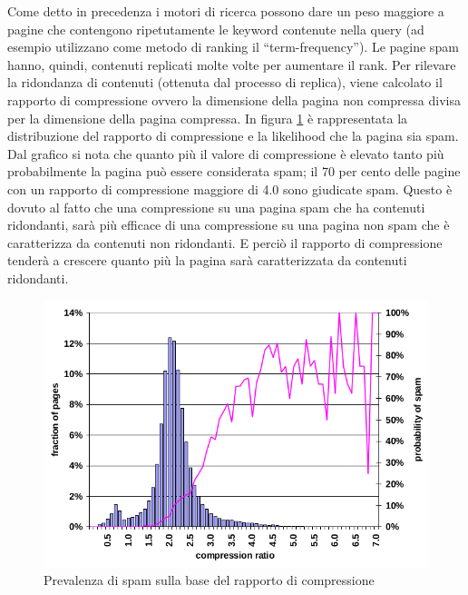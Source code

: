 Come detto in precedenza i  motori di ricerca possono dare un peso maggiore a pagine che contengono ripetutamente le keyword contenute nella query (ad esempio utilizzano come metodo di ranking il ``term-frequency''). Le pagine spam hanno, quindi,  contenuti replicati molte volte per aumentare il rank. Per rilevare la ridondanza di contenuti (ottenuta dal processo di replica), viene calcolato il rapporto di compressione ovvero la dimensione della pagina non compressa divisa per la dimensione della pagina compressa. In figura \ref{fig:fetterly8} è rappresentata la distribuzione del rapporto di compressione e la likelihood che la pagina sia spam. Dal grafico si nota che quanto più il valore di compressione è elevato tanto più probabilmente la pagina può essere considerata spam; il 70 per cento delle pagine con un rapporto di compressione maggiore di 4.0 sono giudicate spam. Questo è dovuto al fatto che una compressione su una pagina spam che ha contenuti ridondanti, sarà più efficace di una compressione su una pagina non spam che è caratterizza da contenuti non ridondanti. E perciò il rapporto di compressione tenderà a crescere quanto più la pagina sarà caratterizzata da contenuti ridondanti.
\begin{figure}[htbp]
\centering
\includegraphics[width=12cm]{immagini/fetterly/fetterly8}
\caption{Prevalenza di spam sulla base del rapporto di compressione}
\label{fig:fetterly8}
\end{figure}

